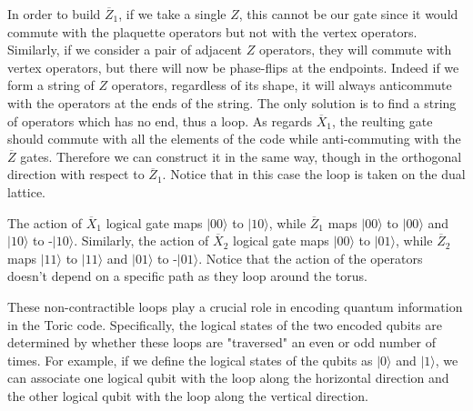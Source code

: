 \documentclass[12pt]{report}
\begin{document}
\begin{minipage}{1 \textwidth}
		In order to build $\overline{Z}_1$, if we take a single $Z$, this cannot be our gate since it would commute with the plaquette operators but not with the vertex operators. 
		Similarly, if we consider a pair of adjacent $Z$ operators, they will commute with vertex operators, but there will now be phase-flips at the endpoints. Indeed if we form a string of $Z$ operators, regardless of its shape, it will always anticommute with the operators at the ends of the string. The only solution is to find a string of operators which has no end, thus a loop.\newline
		As regards $\overline{X}_1$, the reulting gate should commute with all the elements of the code while anti-commuting with the $\overline{Z}$ gates. Therefore we can construct it in the same way, though in the orthogonal direction with respect to $\overline{Z}_1$. Notice that in this case the loop is taken on the dual lattice. \newline
		
		  
		The action of $\overline{X}_1$ logical gate maps $|00\rangle$ to $|10\rangle$, while $\overline{Z}_1$ maps $|00\rangle$ to $|00\rangle$ and $|10\rangle$ to -$|10\rangle$. Similarly, the action of $\overline{X}_2$ logical gate maps $|00\rangle$ to $|01\rangle$, while $\overline{Z}_2$ maps $|11\rangle$ to $|11\rangle$ and $|01\rangle$ to -$|01\rangle$. Notice that the action of the operators doesn't depend on a specific path as they loop around the torus.\newline
		
		These non-contractible loops play a crucial role in encoding quantum information in the Toric code. Specifically, the logical states of the two encoded qubits are determined by whether these loops are "traversed" an even or odd number of times. For example, if we define the logical states of the qubits as $|0\rangle$ and $|1\rangle$, we can associate one logical qubit with the loop along the horizontal direction and the other logical qubit with the loop along the vertical direction. \newline
		
		
		

\end{minipage}
\end{document}
